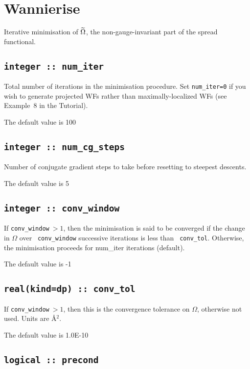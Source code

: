 \section{Wannierise}\label{sec:wann_params}
Iterative minimisation of $\widetilde{\Omega}$, the non-gauge-invariant part of the
spread functional.

\subsection[num\_iter]{\tt integer :: num\_iter}

Total number of iterations in the minimisation procedure.
Set {\tt num\_iter=0} if you wish to generate
  projected WFs rather than maximally-localized WFs (see Example~8 in
  the Tutorial).

The default value is 100

\subsection[num\_cg\_steps]{\tt integer :: num\_cg\_steps}

Number of conjugate gradient steps to take before resetting to steepest descents.

The default value is 5

\subsection[conv\_window]{\tt integer :: conv\_window}

If {\tt conv\_window}$\:>1$, then the minimisation is said to be
  converged if the change in $\Omega$ over {\tt
  conv\_window} successive iterations is less than {\tt
  conv\_tol}. Otherwise, the minimisation proceeds for
  {num\_iter} iterations (default).

The default value is -1

\subsection[conv\_tol]{\tt real(kind=dp) :: conv\_tol}

If {\tt conv\_window}$\:>1$, then this is the convergence tolerance on
$\Omega$, otherwise not used. Units are \AA$^2$.

The default value is 1.0E-10

\subsection[precond]{\tt logical :: precond}

